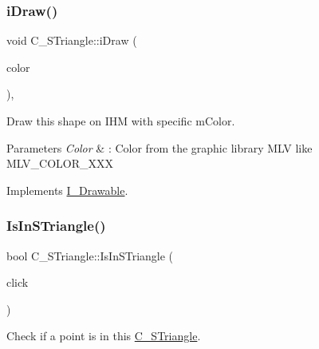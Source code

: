 \mbox{\label{classC__STriangle_ad003b932a467de60b814d897fda38390}} 
\subsubsection{\texorpdfstring{i\+Draw()}{iDraw()}\hspace{0.1cm}{\footnotesize\ttfamily [2/2]}}
{\footnotesize\ttfamily void C\+\_\+\+S\+Triangle\+::i\+Draw (\begin{DoxyParamCaption}\item[{M\+L\+V\+\_\+\+Color}]{color }\end{DoxyParamCaption})\hspace{0.3cm}{\ttfamily [override]}, {\ttfamily [virtual]}}



Draw this shape on I\+HM with specific m\+Color. 


\begin{DoxyParams}{Parameters}
{\em Color} & \+: Color from the graphic library M\+LV like M\+L\+V\+\_\+\+C\+O\+L\+O\+R\+\_\+\+X\+XX \\
\hline
\end{DoxyParams}


Implements \hyperlink{classI__Drawable_a25f6474325614c451a91f019e5fe8010}{I\+\_\+\+Drawable}.

\mbox{\label{classC__STriangle_ae0cfadc631baf280df7e77f011489caa}} 
\subsubsection{\texorpdfstring{Is\+In\+S\+Triangle()}{IsInSTriangle()}}
{\footnotesize\ttfamily bool C\+\_\+\+S\+Triangle\+::\+Is\+In\+S\+Triangle (\begin{DoxyParamCaption}\item[{const \hyperlink{classT__Point}{T\+\_\+\+Point}$<$ double $>$ \&}]{click }\end{DoxyParamCaption})}



Check if a point is in this \hyperlink{classC__STriangle}{C\+\_\+\+S\+Triangle}. 


